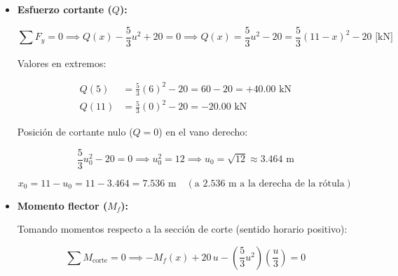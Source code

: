 \begin{itemize}

    \item \textbf{Esfuerzo cortante ($Q$):}

          \begin{equation}

              \sum F_y = 0 \implies Q(x) - \frac{5}{3}u^2 + 20 = 0 \implies Q(x) = \frac{5}{3}u^2 - 20 = \boxed{\frac{5}{3}(11 - x)^2 - 20\text{ [kN]}}

          \end{equation}

          Valores en extremos:

          \begin{align*}

              Q(5)  & = \frac{5}{3}(6)^2 - 20 = 60 - 20 = +40.00\text{ kN} \\

              Q(11) & = \frac{5}{3}(0)^2 - 20 = -20.00\text{ kN}

          \end{align*}

          Posición de cortante nulo ($Q = 0$) en el vano derecho:

          \begin{equation}

              \frac{5}{3}u_0^2 - 20 = 0 \implies u_0^2 = 12 \implies u_0 = \sqrt{12} \approx 3.464\text{ m}

          \end{equation}

          \begin{equation}

              x_0 = 11 - u_0 = 11 - 3.464 = \boxed{7.536\text{ m}} \quad (\text{a } 2.536\text{ m a la derecha de la rótula})

          \end{equation}

    \item \textbf{Momento flector ($M_f$):}

          Tomando momentos respecto a la sección de corte (sentido horario positivo):

          \begin{equation}

              \sum M_{\text{corte}} = 0 \implies -M_f(x) + 20\,u - \left(\frac{5}{3}u^2\right)\left(\frac{u}{3}\right) = 0

          \end{equation}


\end{itemize}
